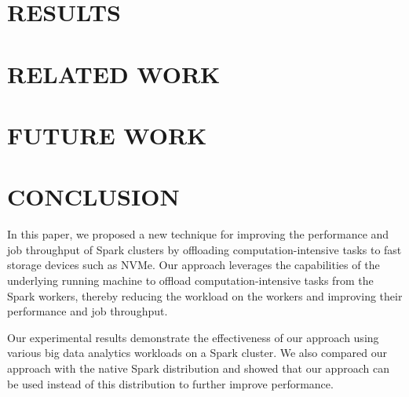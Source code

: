 \documentclass[twocolumn,10pt]{asme2e}
\begin{document}
\section*{RESULTS}

\subsection*{}

\subsection*{}

\subsection*{}

\subsection*{}

\section*{RELATED WORK}

\section*{FUTURE WORK}

\section*{CONCLUSION}

In this paper, we proposed a new technique for improving the performance and job throughput of Spark clusters by offloading computation-intensive tasks to fast storage devices such as NVMe. Our approach leverages the capabilities of the underlying running machine to offload computation-intensive tasks from the Spark workers, thereby reducing the workload on the workers and improving their performance and job throughput.

Our experimental results demonstrate the effectiveness of our approach using various big data analytics workloads on a Spark cluster. We also compared our approach with the native Spark distribution and showed that our approach can be used instead of this distribution to further improve performance.
\end{document}
